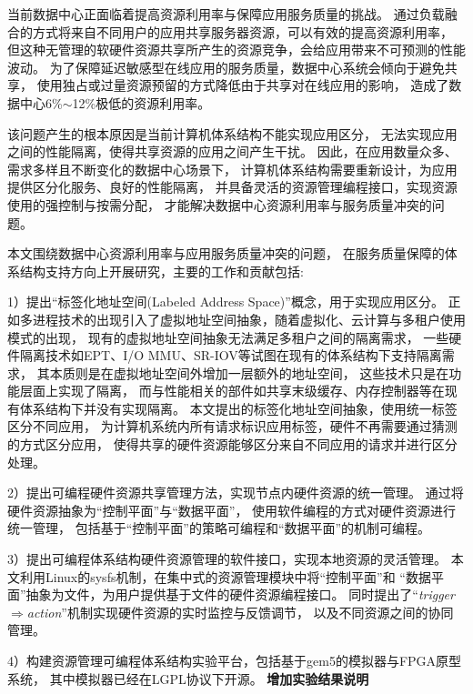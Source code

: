 \begin{cabstract}
  当前数据中心正面临着提高资源利用率与保障应用服务质量的挑战。
  通过负载融合的方式将来自不同用户的应用共享服务器资源，可以有效的提高资源利用率，
  但这种无管理的软硬件资源共享所产生的资源竞争，会给应用带来不可预测的性能波动。
  为了保障延迟敏感型在线应用的服务质量，数据中心系统会倾向于避免共享，
  使用独占或过量资源预留的方式降低由于共享对在线应用的影响，
  造成了数据中心6\%$\sim$12\%极低的资源利用率。

  该问题产生的根本原因是当前计算机体系结构不能实现应用区分，
  无法实现应用之间的性能隔离，使得共享资源的应用之间产生干扰。
  因此，在应用数量众多、需求多样且不断变化的数据中心场景下，
  计算机体系结构需要重新设计，为应用提供区分化服务、良好的性能隔离，
  并具备灵活的资源管理编程接口，实现资源使用的强控制与按需分配，
  才能解决数据中心资源利用率与服务质量冲突的问题。

  本文围绕数据中心资源利用率与应用服务质量冲突的问题，
  在服务质量保障的体系结构支持方向上开展研究，主要的工作和贡献包括:

  1）提出``标签化地址空间(Labeled Address Space)''概念，用于实现应用区分。
     正如多进程技术的出现引入了虚拟地址空间抽象，随着虚拟化、云计算与多租户使用模式的出现，
     现有的虚拟地址空间抽象无法满足多租户之间的隔离需求，
     一些硬件隔离技术如EPT、I/O MMU、SR-IOV等试图在现有的体系结构下支持隔离需求，
     其本质则是在虚拟地址空间外增加一层额外的地址空间，
     这些技术只是在功能层面上实现了隔离，
     而与性能相关的部件如共享末级缓存、内存控制器等在现有体系结构下并没有实现隔离。
     本文提出的标签化地址空间抽象，使用统一标签区分不同应用，
     为计算机系统内所有请求标识应用标签，硬件不再需要通过猜测的方式区分应用，
     使得共享的硬件资源能够区分来自不同应用的请求并进行区分处理。

  2）提出可编程硬件资源共享管理方法，实现节点内硬件资源的统一管理。
     通过将硬件资源抽象为``控制平面''与``数据平面''，
     使用软件编程的方式对硬件资源进行统一管理，
     包括基于``控制平面''的策略可编程和``数据平面''的机制可编程。

  3）提出可编程体系结构硬件资源管理的软件接口，实现本地资源的灵活管理。
     本文利用Linux的sysfs机制，在集中式的资源管理模块中将``控制平面''和
     ``数据平面''抽象为文件，为用户提供基于文件的硬件资源编程接口。
     同时提出了``\emph{trigger$\Rightarrow$action}''机制实现硬件资源的实时监控与反馈调节，
     以及不同资源之间的协同管理。

  4）构建资源管理可编程体系结构实验平台，包括基于gem5的模拟器与FPGA原型系统，
     其中模拟器已经在LGPL协议下开源。
     \textbf{增加实验结果说明}
\end{cabstract}

